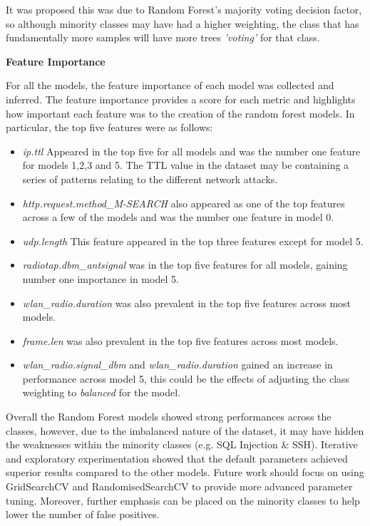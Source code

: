 It was proposed this was due to Random Forest's majority voting decision factor, so although minority classes may have had a higher weighting, the class that has fundamentally more samples will have more trees \textit{'voting'} for that class.



\medskip
\textbf{Feature Importance}

For all the models, the feature importance of each model was collected and inferred. The feature importance provides a score for each metric and highlights how important each feature was to the creation of the random forest models. In particular, the top five features were as follows:

\begin{itemize}
	\item \textit{ip.ttl} Appeared in the top five for all models and was the number one feature for models 1,2,3 and 5. The TTL value in the dataset may be containing a series of patterns relating to the different network attacks.
	\item \textit{http.request.method\_M-SEARCH} also appeared as one of the top features across a few of the models and was the number one feature in model 0. 
	\item \textit{udp.length} This feature appeared in the top three features except for model 5.
  	\item \textit{radiotap.dbm\_antsignal} was in the top five features for all models, gaining number one importance in model 5.
	\item \textit{wlan\_radio.duration} was also prevalent in the top five features across most models.
	\item \textit{frame.len} was also prevalent in the top five features across most models.
	\item \textit{wlan\_radio.signal\_dbm} and \textit{wlan\_radio.duration} gained an increase in performance across model 5, this could be the effects of adjusting the class weighting to \textit{balanced} for the model.
\end{itemize}


\medskip
Overall the Random Forest models showed strong performances across the classes, however, due to the imbalanced nature of the dataset, it may have hidden the weaknesses within the minority classes (e.g. SQL Injection \& SSH). Iterative and exploratory experimentation showed that the default parameters achieved superior results compared to the other models. Future work should focus on using GridSearchCV and RandomisedSearchCV to provide more advanced parameter tuning. Moreover, further emphasis can be placed on the minority classes to help lower the number of false positives.
